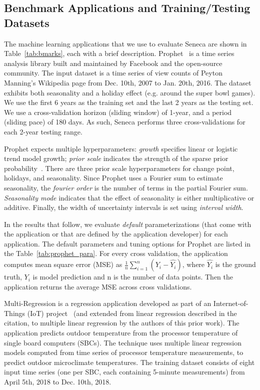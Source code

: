 \subsection{Benchmark Applications and Training/Testing  Datasets}
The machine learning applications that we use to evaluate Seneca 
are shown in Table~\ref{tab:bmarks}, each with 
a brief description.
Prophet~\cite{ref:prophet} is a time series analysis library built and maintained by Facebook and the open-source community. The input dataset is a time series of view counts
of Peyton Manning's Wikipedia page from Dec. 10th, 2007 to Jan. 20th, 2016. 
The dataset exhibits both seasonality and a holiday effect (e.g. around the super bowl games). 
We use the first 6 years as the training set and the last 2 years as the testing set.
We use a cross-validation horizon (sliding window) of 1-year, 
and a period (sliding pace) 
of 180 days.  As such, Seneca performs three cross-validations for each 2-year testing range.

Prophet expects multiple hyperparameters: \textit{growth} specifies linear or logistic trend model growth; \textit{prior scale} indicates the strength of the 
sparse prior probability~\cite{ref:sparse_prior}. 
There are three prior scale hyperparameters for change point, holidays, and seasonality. 
Since Prophet uses a Fourier sum to estimate seasonality, 
the \textit{fourier order} is the number of terms in the partial Fourier 
sum. \textit{Seasonality mode} indicates that the effect of seasonality is either 
multiplicative or additive. Finally, the width of uncertainty intervals 
is set using \textit{interval width}.

In the results that follow, we evaluate \textit{default} parameterizations (that come with 
the application or that are defined by the application developer) for each application.  
The default parameters and tuning options for Prophet are listed in the Table~\ref{tab:prophet_para}. For every cross validation, the application computes mean square error (MSE) as $\frac{1}{n}\sum_{i=1}^{n}(Y_i - \hat{Y_i})$, where $\hat{Y_i}$ is the ground truth, $Y_i$ is model prediction and n is the number of data points. Then the application returns the average MSE across cross validations. 


Multi-Regression is a regression application developed as part of
an Internet-of-Things (IoT) project~\cite{iot-cpu} (and extended
from linear regression described in the citation, 
to multiple linear regression by the authors of this prior work).
The application predicts outdoor temperature from the processor 
temperature of single board computers (SBCs).  
The technique uses multiple linear regression models computed from time
series of processor temperature measurements,
to predict outdoor microclimate temperatures. %
The training dataset consists of eight input time series (one per SBC, each containing 
5-minute measurements) from April 5th, 2018 to Dec. 10th, 2018.

